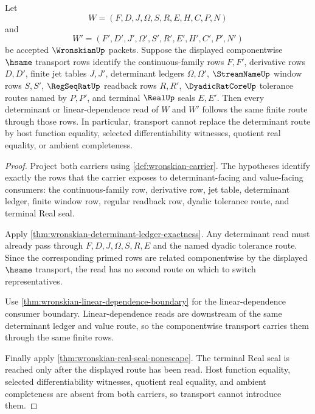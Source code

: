 \begin{theorem}
\label{thm:wronskian-determinant-route-stability}
Let
$$
W=(F,D,J,\Omega,S,R,E,H,C,P,N)
$$
and
$$
W'=(F',D',J',\Omega',S',R',E',H',C',P',N')
$$
be accepted $\WronskianUp$ packets. Suppose the displayed componentwise $\hsame$ transport rows identify the continuous-family rows $F,F'$, derivative rows $D,D'$, finite jet tables $J,J'$, determinant ledgers $\Omega,\Omega'$, $\StreamNameUp$ window rows $S,S'$, $\RegSeqRatUp$ readback rows $R,R'$, $\DyadicRatCoreUp$ tolerance routes named by $P,P'$, and terminal $\RealUp$ seals $E,E'$. Then every determinant or linear-dependence read of $W$ and $W'$ follows the same finite route through those rows. In particular, transport cannot replace the determinant route by host function equality, selected differentiability witnesses, quotient real equality, or ambient completeness.
\end{theorem}
\begin{proof}
Project both carriers using \autoref{def:wronskian-carrier}. The hypotheses identify exactly the rows that the carrier exposes to determinant-facing and value-facing consumers: the continuous-family row, derivative row, jet table, determinant ledger, finite window row, regular readback row, dyadic tolerance route, and terminal Real seal.

Apply \autoref{thm:wronskian-determinant-ledger-exactness}. Any determinant read must already pass through $F,D,J,\Omega,S,R,E$ and the named dyadic tolerance route. Since the corresponding primed rows are related componentwise by the displayed $\hsame$ transport, the read has no second route on which to switch representatives.

Use \autoref{thm:wronskian-linear-dependence-boundary} for the linear-dependence consumer boundary. Linear-dependence reads are downstream of the same determinant ledger and value route, so the componentwise transport carries them through the same finite rows.

Finally apply \autoref{thm:wronskian-real-seal-nonescape}. The terminal Real seal is reached only after the displayed route has been read. Host function equality, selected differentiability witnesses, quotient real equality, and ambient completeness are absent from both carriers, so transport cannot introduce them.
\end{proof}

